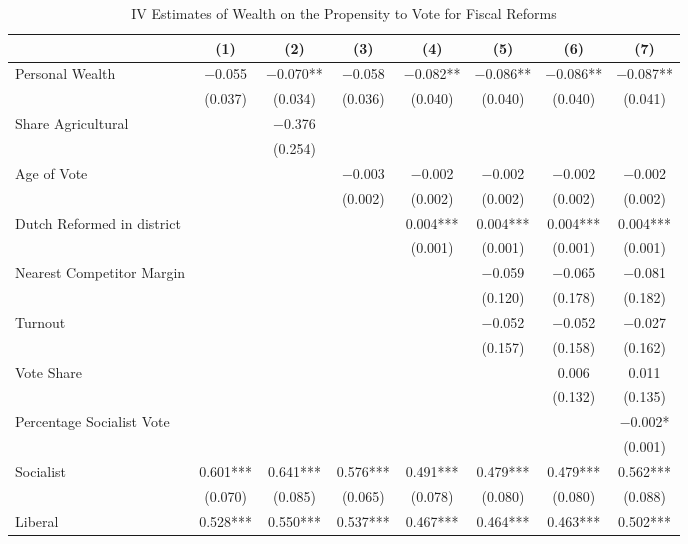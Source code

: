 \begin{table}

\caption{\label{tab:ivresults2}IV Estimates of Wealth on the Propensity to Vote for Fiscal Reforms}
\centering
\begin{tabular}[t]{lccccccc}
\toprule
  & (1) & (2) & (3) & (4) & (5) & (6) & (7)\\
\midrule
Personal Wealth & \num{-0.055} & \num{-0.070}** & \num{-0.058} & \num{-0.082}** & \num{-0.086}** & \num{-0.086}** & \num{-0.087}**\\
 & (\num{0.037}) & (\num{0.034}) & (\num{0.036}) & (\num{0.040}) & (\num{0.040}) & (\num{0.040}) & (\num{0.041})\\
Share Agricultural &  & \num{-0.376} &  &  &  &  & \\
 &  & (\num{0.254}) &  &  &  &  & \\
Age of Vote &  &  & \num{-0.003} & \num{-0.002} & \num{-0.002} & \num{-0.002} & \num{-0.002}\\
 &  &  & (\num{0.002}) & (\num{0.002}) & (\num{0.002}) & (\num{0.002}) & (\num{0.002})\\
Dutch Reformed in district &  &  &  & \num{0.004}*** & \num{0.004}*** & \num{0.004}*** & \num{0.004}***\\
 &  &  &  & (\num{0.001}) & (\num{0.001}) & (\num{0.001}) & (\num{0.001})\\
Nearest Competitor Margin &  &  &  &  & \num{-0.059} & \num{-0.065} & \num{-0.081}\\
 &  &  &  &  & (\num{0.120}) & (\num{0.178}) & (\num{0.182})\\
Turnout &  &  &  &  & \num{-0.052} & \num{-0.052} & \num{-0.027}\\
 &  &  &  &  & (\num{0.157}) & (\num{0.158}) & (\num{0.162})\\
Vote Share &  &  &  &  &  & \num{0.006} & \num{0.011}\\
 &  &  &  &  &  & (\num{0.132}) & (\num{0.135})\\
Percentage Socialist Vote &  &  &  &  &  &  & \num{-0.002}*\\
 &  &  &  &  &  &  & (\num{0.001})\\
Socialist & \num{0.601}*** & \num{0.641}*** & \num{0.576}*** & \num{0.491}*** & \num{0.479}*** & \num{0.479}*** & \num{0.562}***\\
 & (\num{0.070}) & (\num{0.085}) & (\num{0.065}) & (\num{0.078}) & (\num{0.080}) & (\num{0.080}) & (\num{0.088})\\
Liberal & \num{0.528}*** & \num{0.550}*** & \num{0.537}*** & \num{0.467}*** & \num{0.464}*** & \num{0.463}*** & \num{0.502}***\\

\end{tabular}
\end{table}
